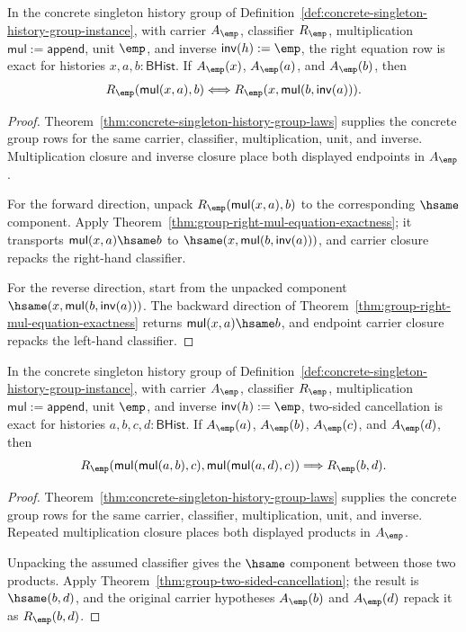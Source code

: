 \begin{theorem}
\label{thm:group-singleton-right-equation-exact}
In the concrete singleton history group of
Definition~\ref{def:concrete-singleton-history-group-instance}, with carrier
$A_{\emp}$, classifier $R_{\emp}$, multiplication
$\mathsf{mul}:=\mathsf{append}$, unit $\emp$, and inverse
$\mathsf{inv}(h):=\emp$, the right equation row is exact for histories
$x,a,b:\mathsf{BHist}$. If $A_{\emp}(x)$, $A_{\emp}(a)$, and
$A_{\emp}(b)$, then
$$
R_{\emp}(\mathsf{mul}(x,a),b)
\Longleftrightarrow
R_{\emp}(x,\mathsf{mul}(b,\mathsf{inv}(a))).
$$
\end{theorem}
\begin{proof}
Theorem~\ref{thm:concrete-singleton-history-group-laws} supplies the concrete
group rows for the same carrier, classifier, multiplication, unit, and inverse.
Multiplication closure and inverse closure place both displayed endpoints in
$A_{\emp}$.

For the forward direction, unpack
$R_{\emp}(\mathsf{mul}(x,a),b)$ to the corresponding $\hsame$ component. Apply
Theorem~\ref{thm:group-right-mul-equation-exactness}; it transports
$\mathsf{mul}(x,a)\hsame b$ to
$\hsame(x,\mathsf{mul}(b,\mathsf{inv}(a)))$, and carrier closure repacks the
right-hand classifier.

For the reverse direction, start from the unpacked component
$\hsame(x,\mathsf{mul}(b,\mathsf{inv}(a)))$. The backward direction of
Theorem~\ref{thm:group-right-mul-equation-exactness} returns
$\mathsf{mul}(x,a)\hsame b$, and endpoint carrier closure repacks the
left-hand classifier.
\end{proof}

\begin{theorem}
\label{thm:group-singleton-two-sided-cancel}
In the concrete singleton history group of
Definition~\ref{def:concrete-singleton-history-group-instance}, with carrier
$A_{\emp}$, classifier $R_{\emp}$, multiplication
$\mathsf{mul}:=\mathsf{append}$, unit $\emp$, and inverse
$\mathsf{inv}(h):=\emp$, two-sided cancellation is exact for histories
$a,b,c,d:\mathsf{BHist}$. If $A_{\emp}(a)$, $A_{\emp}(b)$, $A_{\emp}(c)$, and
$A_{\emp}(d)$, then
$$
R_{\emp}(\mathsf{mul}(\mathsf{mul}(a,b),c),
\mathsf{mul}(\mathsf{mul}(a,d),c))
\Longrightarrow R_{\emp}(b,d).
$$
\end{theorem}
\begin{proof}
Theorem~\ref{thm:concrete-singleton-history-group-laws} supplies the concrete
group rows for the same carrier, classifier, multiplication, unit, and inverse.
Repeated multiplication closure places both displayed products in $A_{\emp}$.

Unpacking the assumed classifier gives the $\hsame$ component between those two
products. Apply Theorem~\ref{thm:group-two-sided-cancellation}; the result is
$\hsame(b,d)$, and the original carrier hypotheses $A_{\emp}(b)$ and
$A_{\emp}(d)$ repack it as $R_{\emp}(b,d)$.
\end{proof}

